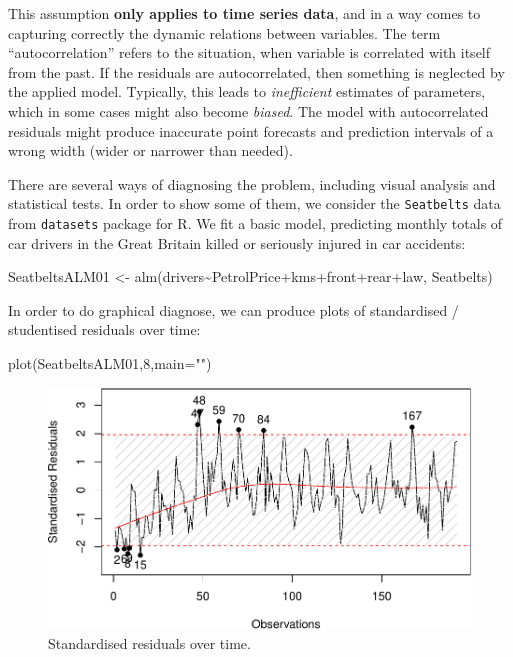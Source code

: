 \documentclass[
]{book}
\newenvironment{Shaded}{\begin{snugshade}}{\end{snugshade}}
\newcommand{\AttributeTok}[1]{\textcolor[rgb]{0.77,0.63,0.00}{#1}}
\newcommand{\DecValTok}[1]{\textcolor[rgb]{0.00,0.00,0.81}{#1}}
\newcommand{\FunctionTok}[1]{\textcolor[rgb]{0.00,0.00,0.00}{#1}}
\newcommand{\NormalTok}[1]{#1}
\newcommand{\OtherTok}[1]{\textcolor[rgb]{0.56,0.35,0.01}{#1}}
\newcommand{\SpecialCharTok}[1]{\textcolor[rgb]{0.00,0.00,0.00}{#1}}
\newcommand{\StringTok}[1]{\textcolor[rgb]{0.31,0.60,0.02}{#1}}
\theoremstyle{definition}
\theoremstyle{definition}
\theoremstyle{definition}
\theoremstyle{definition}
\theoremstyle{remark}
\begin{document}
This assumption \textbf{only applies to time series data}, and in a way comes to capturing correctly the dynamic relations between variables. The term ``autocorrelation'' refers to the situation, when variable is correlated with itself from the past. If the residuals are autocorrelated, then something is neglected by the applied model. Typically, this leads to \emph{inefficient} estimates of parameters, which in some cases might also become \emph{biased}. The model with autocorrelated residuals might produce inaccurate point forecasts and prediction intervals of a wrong width (wider or narrower than needed).

There are several ways of diagnosing the problem, including visual analysis and statistical tests. In order to show some of them, we consider the \texttt{Seatbelts} data from \texttt{datasets} package for R. We fit a basic model, predicting monthly totals of car drivers in the Great Britain killed or seriously injured in car accidents:

\begin{Shaded}
\begin{Highlighting}[]
\NormalTok{SeatbeltsALM01 }\OtherTok{\textless{}{-}} \FunctionTok{alm}\NormalTok{(drivers}\SpecialCharTok{\textasciitilde{}}\NormalTok{PetrolPrice}\SpecialCharTok{+}\NormalTok{kms}\SpecialCharTok{+}\NormalTok{front}\SpecialCharTok{+}\NormalTok{rear}\SpecialCharTok{+}\NormalTok{law, Seatbelts)}
\end{Highlighting}
\end{Shaded}

In order to do graphical diagnose, we can produce plots of standardised / studentised residuals over time:

\begin{Shaded}
\begin{Highlighting}[]
\FunctionTok{plot}\NormalTok{(SeatbeltsALM01,}\DecValTok{8}\NormalTok{,}\AttributeTok{main=}\StringTok{""}\NormalTok{)}
\end{Highlighting}
\end{Shaded}

\begin{figure}
\centering
\includegraphics{Svetunkov---Statistics-for-Business-Analytics_files/figure-latex/diagnostics08-1.pdf}
\caption{\label{fig:diagnostics08}Standardised residuals over time.}
\end{figure}
\end{document}

